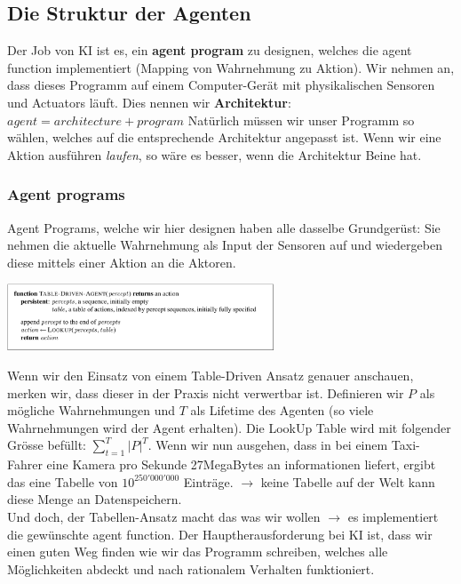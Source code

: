 \documentclass{article}
\newenvironment{Figure}
	{\par\medskip\noindent\minipage{\linewidth}}
	{\endminipage\par\medskip}
\theoremstyle{merke}
\theoremstyle{definition}
\begin{document}
\subsection{Die Struktur der Agenten}
Der Job von KI ist es, ein \textbf{agent program} zu designen, welches die agent function implementiert (Mapping von Wahrnehmung zu Aktion). Wir nehmen an, dass dieses Programm auf einem Computer-Gerät mit physikalischen Sensoren und Actuators läuft. Dies nennen wir \textbf{Architektur}:\\
$ agent = architecture + program$
Natürlich müssen wir unser Programm so wählen, welches auf die entsprechende Architektur angepasst ist. Wenn wir eine Aktion ausführen \textit{laufen}, so wäre es besser, wenn die Architektur Beine hat.

\subsubsection{Agent programs}
Agent Programs, welche wir hier designen haben alle dasselbe Grundgerüst: Sie nehmen die aktuelle Wahrnehmung als Input der Sensoren auf und wiedergeben diese mittels einer Aktion an die Aktoren.
\begin{Figure}
\centering
\includegraphics[width=300px]{img/TableDrivenAgent.png}
	\label{fig:Beispieltabelle für Table Driven Agent}
\end{Figure}
Wenn wir den Einsatz von einem Table-Driven Ansatz genauer anschauen, merken wir, dass dieser in der Praxis nicht verwertbar ist. 
Definieren wir $P$ als mögliche Wahrnehmungen und $T$ als Lifetime des Agenten (so viele Wahrnehmungen wird der Agent erhalten). Die LookUp Table wird mit folgender Grösse befüllt: $\sum\limits_{t=1}^{T} |P|^T$. Wenn wir nun ausgehen, dass in bei einem Taxi-Fahrer eine Kamera pro Sekunde 27MegaBytes an informationen liefert, ergibt das eine Tabelle von $10^{250'000'000}$ Einträge. $\rightarrow$ keine Tabelle auf der Welt kann diese Menge an Datenspeichern.\\

Und doch, der Tabellen-Ansatz macht das was wir wollen $\rightarrow$ es implementiert die gewünschte agent function. Der Hauptherausforderung bei KI ist, dass wir einen guten Weg finden wie wir das Programm schreiben, welches alle Möglichkeiten abdeckt und nach rationalem Verhalten funktioniert.
\end{document}
